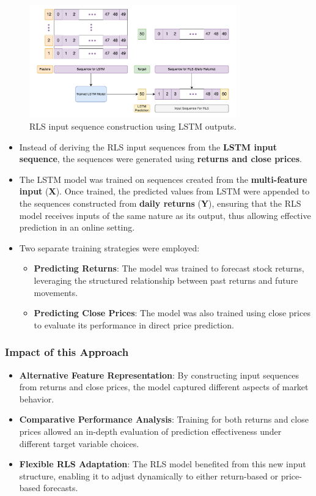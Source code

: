 \begin{figure}[h!]
    \centering
    \includegraphics[width=0.8\textwidth]{Images/RLS_Input_M.pdf}
    \caption{RLS input sequence construction using LSTM outputs.}
    \label{fig:RLS_Input_M}
\end{figure}

\begin{itemize}
    \item Instead of deriving the RLS input sequences from the \textbf{LSTM input sequence}, the sequences were generated using \textbf{returns and close prices}.  
    \item The LSTM model was trained on sequences created from the \textbf{multi-feature input} (\textbf{X}). Once trained, the predicted values from LSTM were appended to the sequences constructed from \textbf{daily returns} (\textbf{Y}), ensuring that the RLS model receives inputs of the same nature as its output, thus allowing effective prediction in an online setting.
    \item Two separate training strategies were employed:  
    \begin{itemize}
        \item \textbf{Predicting Returns}: The model was trained to forecast stock returns, leveraging the structured relationship between past returns and future movements.  
        \item \textbf{Predicting Close Prices}: The model was also trained using close prices to evaluate its performance in direct price prediction.
    \end{itemize}
\end{itemize}

\subsubsection{Impact of this Approach}

\begin{itemize}
    \item \textbf{Alternative Feature Representation}: By constructing input sequences from returns and close prices, the model captured different aspects of market behavior.  
    \item \textbf{Comparative Performance Analysis}: Training for both returns and close prices allowed an in-depth evaluation of prediction effectiveness under different target variable choices.  
    \item \textbf{Flexible RLS Adaptation}: The RLS model benefited from this new input structure, enabling it to adjust dynamically to either return-based or price-based forecasts.  
\end{itemize}

